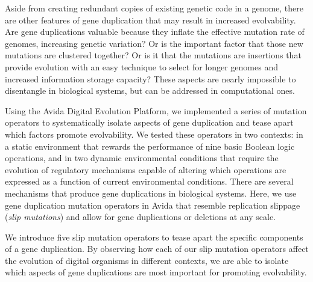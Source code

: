 Aside from creating redundant copies of existing genetic code in a genome, there are other features of gene duplication that may result in increased evolvability. Are gene duplications valuable because they inflate the effective mutation rate of genomes, increasing genetic variation?  Or is the important factor that those new mutations are clustered together?
Or is it that the mutations are insertions that provide evolution with an easy technique to select for longer genomes %
and increased information storage capacity? %
These aspects are nearly impossible to disentangle in biological systems, but can be addressed in computational ones.

Using the Avida Digital Evolution Platform, we implemented a series of mutation operators to systematically isolate aspects of gene duplication and tease apart which factors promote evolvability. We tested these operators in two %
contexts: in a static environment that rewards the performance of nine basic Boolean logic operations, and in two dynamic environmental conditions that require the evolution of regulatory mechanisms capable of altering which operations are expressed as a function of current environmental conditions. %
There are several mechanisms that produce gene duplications in biological systems. Here, we use gene duplication mutation operators in Avida that resemble replication slippage \citep{bzymek_instability_2001} (\textit{slip mutations}) and allow for gene duplications or deletions at any scale.

We introduce five slip mutation operators to tease apart the specific components of a gene duplication.
By observing how each of our slip mutation operators affect the evolution of digital organisms in different contexts, we are able to isolate which aspects of gene duplications are most important for promoting evolvability.

